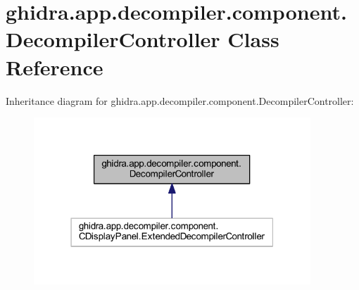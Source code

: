 \hypertarget{classghidra_1_1app_1_1decompiler_1_1component_1_1_decompiler_controller}{}\section{ghidra.\+app.\+decompiler.\+component.\+Decompiler\+Controller Class Reference}
\label{classghidra_1_1app_1_1decompiler_1_1component_1_1_decompiler_controller}


Inheritance diagram for ghidra.\+app.\+decompiler.\+component.\+Decompiler\+Controller\+:
\nopagebreak
\begin{figure}[H]
\begin{center}
\leavevmode
\includegraphics[width=295pt]{classghidra_1_1app_1_1decompiler_1_1component_1_1_decompiler_controller__inherit__graph}
\end{center}
\end{figure}

